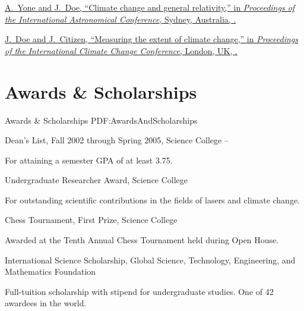 \documentclass[letterpaper,MMMyyyy,nonstop]{simpleresumecv}
\begin{document}
\begin{body}
\Gap
\NumberedItem{[10]}
\href{http://www.example.com/my-paper-doi-2}
{A.~Yone and \underline{J.~Doe},
``Climate change and general relativity,''
in \textit{Proceedings of the International Astronomical Conference},
Sydney, Australia,
.}

\Gap
\NumberedItem{{\CharSpace}[1]}
\href{http://www.example.com/my-paper-doi-1}
{\underline{J.~Doe} and J.~Citizen,
``Measuring the extent of climate change,''
in \textit{Proceedings of the International Climate Change Conference},
London, UK,
.}


\section
{Awards \&\newline
Scholarships}
{Awards \& Scholarships}
{PDF:AwardsAndScholarships}

\BulletItem
Dean's List,
Fall 2002 through Spring 2005,
Science College
\hfill
{} --
\begin{detail}
\SubItem
For attaining a semester GPA of at least 3.75.
\end{detail}

\Gap
\BulletItem
Undergraduate Researcher Award,
Science College
\hfill
{}
\begin{detail}
\SubItem
For outstanding scientific contributions in the fields of lasers and climate change.
\end{detail}

\Gap
\BulletItem
Chess Tournament,
First Prize,
Science College
\hfill
{}
\begin{detail}
\SubItem
Awarded at the Tenth Annual Chess Tournament held during Open House.
\end{detail}

\Gap
\BulletItem
International Science Scholarship,
\hfill
{}
\newline
Global Science, Technology, Engineering, and Mathematics Foundation
\begin{detail}
\SubItem
Full-tuition scholarship with stipend for undergraduate studies.
One of 42 awardees in the world.
\end{detail}



\end{body}
\end{document}
